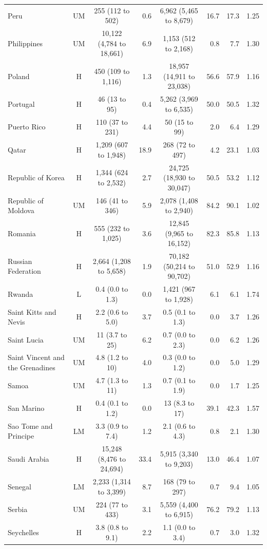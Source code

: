 \begin{longtable}{lccrcrrr}
Peru & UM & 255 (112 to 502) & 0.6 & 6,962 (5,465 to 8,679) & 16.7 & 17.3 & 1.25 \\
Philippines & UM & 10,122 (4,784 to 18,661) & 6.9 & 1,153 (512 to 2,168) & 0.8 & 7.7 & 1.30 \\
Poland & H & 450 (109 to 1,116) & 1.3 & 18,957 (14,911 to 23,038) & 56.6 & 57.9 & 1.16 \\
Portugal & H & 46 (13 to 95) & 0.4 & 5,262 (3,969 to 6,535) & 50.0 & 50.5 & 1.32 \\
Puerto Rico & H & 110 (37 to 231) & 4.4 & 50 (15 to 99) & 2.0 & 6.4 & 1.29 \\
Qatar & H & 1,209 (607 to 1,948) & 18.9 & 268 (72 to 497) & 4.2 & 23.1 & 1.03 \\
Republic of Korea & H & 1,344 (624 to 2,532) & 2.7 & 24,725 (18,930 to 30,047) & 50.5 & 53.2 & 1.12 \\
Republic of Moldova & UM & 146 (41 to 346) & 5.9 & 2,078 (1,408 to 2,940) & 84.2 & 90.1 & 1.02 \\
Romania & H & 555 (232 to 1,025) & 3.6 & 12,845 (9,965 to 16,152) & 82.3 & 85.8 & 1.13 \\
Russian Federation & H & 2,664 (1,208 to 5,658) & 1.9 & 70,182 (50,214 to 90,702) & 51.0 & 52.9 & 1.16 \\
Rwanda & L & 0.4 (0.0 to 1.3) & 0.0 & 1,421 (967 to 1,928) & 6.1 & 6.1 & 1.74 \\
Saint Kitts and Nevis & H & 2.2 (0.6 to 5.0) & 3.7 & 0.5 (0.1 to 1.3) & 0.0 & 3.7 & 1.26 \\
Saint Lucia & UM & 11 (3.7 to 25) & 6.2 & 0.7 (0.0 to 2.3) & 0.0 & 6.2 & 1.26 \\
Saint Vincent and the Grenadines & UM & 4.8 (1.2 to 10) & 4.0 & 0.3 (0.0 to 1.2) & 0.0 & 5.0 & 1.29 \\
Samoa & UM & 4.7 (1.3 to 11) & 1.3 & 0.7 (0.1 to 1.9) & 0.0 & 1.7 & 1.25 \\
San Marino & H & 0.4 (0.1 to 1.2) & 0.0 & 13 (8.3 to 17) & 39.1 & 42.3 & 1.57 \\
Sao Tome and Principe & LM & 3.3 (0.9 to 7.4) & 1.2 & 2.1 (0.6 to 4.3) & 0.8 & 2.1 & 1.30 \\
Saudi Arabia & H & 15,248 (8,476 to 24,694) & 33.4 & 5,915 (3,340 to 9,203) & 13.0 & 46.4 & 1.07 \\
Senegal & LM & 2,233 (1,314 to 3,399) & 8.7 & 168 (79 to 297) & 0.7 & 9.4 & 1.05 \\
Serbia & UM & 224 (77 to 433) & 3.1 & 5,559 (4,400 to 6,915) & 76.2 & 79.2 & 1.13 \\
Seychelles & H & 3.8 (0.8 to 9.1) & 2.2 & 1.1 (0.0 to 3.4) & 0.7 & 3.0 & 1.32 \\

\end{longtable}
